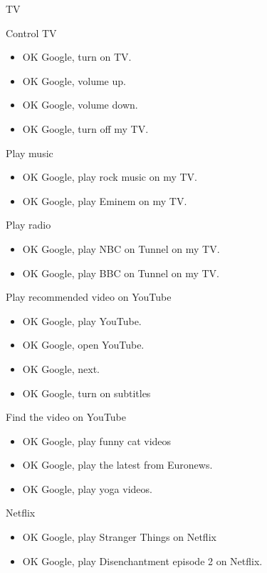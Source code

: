 \documentclass[
  a4paper,
]{article}
\begin{document}
TV

Control TV

\begin{itemize}
\item
  OK Google, turn on TV.
\item
  OK Google, volume up.
\item
  OK Google, volume down.
\item
  OK Google, turn off my TV.
\end{itemize}

Play music

\begin{itemize}
\item
  OK Google, play rock music on my TV.
\item
  OK Google, play Eminem on my TV.
\end{itemize}

Play radio

\begin{itemize}
\item
  OK Google, play NBC on Tunnel on my TV.
\item
  OK Google, play BBC on Tunnel on my TV.
\end{itemize}

Play recommended video on YouTube

\begin{itemize}
\item
  OK Google, play YouTube.
\item
  OK Google, open YouTube.
\item
  OK Google, next.
\item
  OK Google, turn on subtitles
\end{itemize}

Find the video on YouTube~~

\begin{itemize}
\item
  OK Google, play funny cat videos
\item
  OK Google, play the latest from Euronews.
\item
  OK Google, play yoga videos.
\end{itemize}

Netflix

\begin{itemize}
\item
  OK Google, play Stranger Things on Netflix
\item
  OK Google, play Disenchantment episode 2 on Netflix.
\end{itemize}
\end{document}
